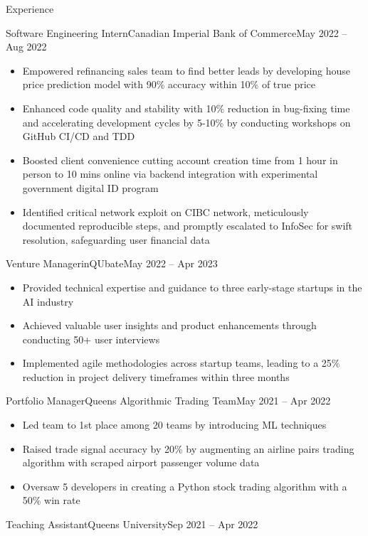 \documentclass[]{mcdowellcv}
\begin{document}
\begin{cvsection}{Experience}
\begin{cvsubsection}{Software Engineering Intern}{Canadian Imperial Bank of Commerce}{May 2022 -- Aug 2022}
		\begin{itemize}%
			\item Empowered refinancing sales team to find better leads by developing house price prediction model with 90\% accuracy within 10\% of true price
			\item Enhanced code quality and stability with 10\% reduction in bug-fixing time and accelerating development cycles by 5-10\% by conducting workshops on GitHub CI/CD and TDD
			\item Boosted client convenience cutting account creation time from 1 hour in person to 10 mins online via backend integration with experimental government digital ID program
			\item Identified critical network exploit on CIBC network, meticulously documented reproducible steps, and promptly escalated to InfoSec for swift resolution, safeguarding user financial data
		\end{itemize}
	\end{cvsubsection}
	\begin{cvsubsection}{Venture Manager}{inQUbate}{May 2022 -- Apr 2023}   
		\begin{itemize}%
			\item Provided technical expertise and guidance to three early-stage startups in the AI industry
			\item Achieved valuable user insights and product enhancements through conducting 50+ user interviews
			\item Implemented agile methodologies across startup teams, leading to a 25\% reduction in project delivery timeframes within three months
		\end{itemize}
	\end{cvsubsection}
	\begin{cvsubsection}{Portfolio Manager}{Queen\textquotesingle{}s Algorithmic Trading Team}{May 2021 -- Apr 2022}
		            
		\begin{itemize}%
			\item Led team to 1st place among 20 teams by introducing ML techniques
			\item Raised trade signal accuracy by 20\% by augmenting an airline pairs trading algorithm with scraped airport passenger volume data
			\item Oversaw 5 developers in creating a Python stock trading algorithm with a 50\% win rate
		\end{itemize}
	\end{cvsubsection}
	\begin{cvsubsection}{Teaching Assistant}{Queen\textquotesingle{}s University}{Sep 2021 -- Apr 2022}
		            

\end{cvsubsection}
\end{cvsection}
\end{document}
